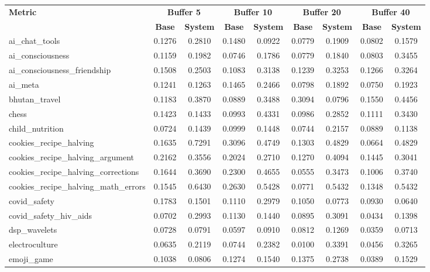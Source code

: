 \begin{landscape}
\begin{longtable}{@{}p{3.8cm}cccccccc@{}}
\toprule
\textbf{Metric} & \multicolumn{2}{c}{\textbf{Buffer 5}} & \multicolumn{2}{c}{\textbf{Buffer 10}} & \multicolumn{2}{c}{\textbf{Buffer 20}} & \multicolumn{2}{c}{\textbf{Buffer 40}} \\
\cmidrule(lr){2-3}\cmidrule(lr){4-5}\cmidrule(lr){6-7}\cmidrule(lr){8-9}
 & \textbf{Base} & \textbf{System} & \textbf{Base} & \textbf{System} & \textbf{Base} & \textbf{System} & \textbf{Base} & \textbf{System} \\
\midrule
\endhead
ai\_chat\_tools & 0.1276 & 0.2810 & 0.1480 & 0.0922 & 0.0779 & 0.1909 & 0.0802 & 0.1579 \\
ai\_consciousness & 0.1159 & 0.1982 & 0.0746 & 0.1786 & 0.0779 & 0.1840 & 0.0803 & 0.3455 \\
ai\_consciousness\_friendship & 0.1508 & 0.2503 & 0.1083 & 0.3138 & 0.1239 & 0.3253 & 0.1266 & 0.3264 \\
ai\_meta & 0.1241 & 0.1263 & 0.1465 & 0.2466 & 0.0798 & 0.1892 & 0.0750 & 0.1923 \\
bhutan\_travel & 0.1183 & 0.3870 & 0.0889 & 0.3488 & 0.3094 & 0.0796 & 0.1550 & 0.4456 \\
chess & 0.1423 & 0.1433 & 0.0993 & 0.4331 & 0.0986 & 0.2852 & 0.1111 & 0.3430 \\
child\_nutrition & 0.0724 & 0.1439 & 0.0999 & 0.1448 & 0.0744 & 0.2157 & 0.0889 & 0.1138 \\
cookies\_recipe\_halving & 0.1635 & 0.7291 & 0.3096 & 0.4749 & 0.1303 & 0.4829 & 0.0664 & 0.4829 \\
cookies\_recipe\_halving\_argument & 0.2162 & 0.3556 & 0.2024 & 0.2710 & 0.1270 & 0.4094 & 0.1445 & 0.3041 \\
cookies\_recipe\_halving\_corrections & 0.1644 & 0.3690 & 0.2300 & 0.4655 & 0.0555 & 0.3473 & 0.1006 & 0.3740 \\
cookies\_recipe\_halving\_math\_errors & 0.1545 & 0.6430 & 0.2630 & 0.5428 & 0.0771 & 0.5432 & 0.1348 & 0.5432 \\
covid\_safety & 0.1783 & 0.1501 & 0.1110 & 0.2979 & 0.1050 & 0.0773 & 0.0930 & 0.0640 \\
covid\_safety\_hiv\_aids & 0.0702 & 0.2993 & 0.1130 & 0.1440 & 0.0895 & 0.3091 & 0.0434 & 0.1398 \\
dsp\_wavelets & 0.0728 & 0.0791 & 0.0597 & 0.0910 & 0.0812 & 0.1269 & 0.0359 & 0.0713 \\
electroculture & 0.0635 & 0.2119 & 0.0744 & 0.2382 & 0.0100 & 0.3391 & 0.0456 & 0.3265 \\
emoji\_game & 0.1038 & 0.0806 & 0.1274 & 0.1540 & 0.1375 & 0.2738 & 0.0389 & 0.1529 \\

\end{longtable}
\end{landscape}
